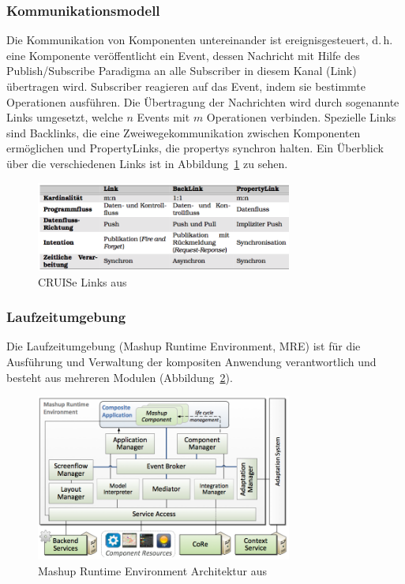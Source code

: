 \documentclass[
	headsepline,
	footsepline,
	fontsize=12pt,
	bibliography=totoc
]{scrbook}
\begin{document}
\subsubsection{Kommunikationsmodell}
\label{section:standderforschung:grundlagen:cruise_vizboard:kommunikationsmodell}

Die Kommunikation von Komponenten untereinander ist ereignisgesteuert, d.\,h. eine Komponente veröffentlicht ein Event, dessen Nachricht mit Hilfe des Publish/Subscribe Paradigma an alle Subscriber in diesem Kanal (Link) übertragen wird. Subscriber reagieren auf das Event, indem sie bestimmte Operationen ausführen. Die Übertragung der Nachrichten wird durch sogenannte Links umgesetzt, welche $n$ Events mit $m$ Operationen verbinden. Spezielle Links sind Backlinks, die eine Zweiwegekommunikation zwischen Komponenten ermöglichen und PropertyLinks, die propertys synchron halten. Ein Überblick über die verschiedenen Links ist in Abbildung~\ref{figure:cruise_links} zu sehen.

\begin{figure}[htbp]
	\centering
	\includegraphics[width=0.75\textwidth]{images/grundlagen-cruise_links.png}
	\caption{CRUISe Links aus \cite{Pietschmann2012}}
	\label{figure:cruise_links}
\end{figure}

\subsubsection{Laufzeitumgebung}
\label{section:standderforschung:grundlagen:cruise_vizboard:laufzeitumgebung}

Die Laufzeitumgebung (Mashup Runtime Environment, MRE) ist für die Ausführung und Verwaltung der kompositen Anwendung verantwortlich und besteht aus mehreren Modulen (Abbildung~\ref{figure:cruise_mre}).

\begin{figure}[htbp]
	\centering
	\includegraphics[width=0.75\textwidth]{images/grundlagen-cruise_mre.png}
	\caption{Mashup Runtime Environment Architektur aus \cite{Pietschmann2012}}
	\label{figure:cruise_mre}
\end{figure}
\end{document}
